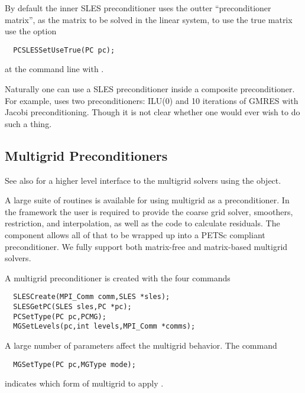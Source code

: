 By default the inner SLES preconditioner uses the outter ``preconditioner matrix'', 
as the matrix to be solved in the linear system, to use the true matrix use the 
option 
\begin{verbatim}
  PCSLESSetUseTrue(PC pc);
\end{verbatim}
at the command line with . 

Naturally one can use a SLES preconditioner inside a composite preconditioner. For example,
uses two preconditioners: ILU(0) and 10 iterations of GMRES with Jacobi preconditioning. Though
it is not clear whether one would ever wish to do such a thing.

\subsection{Multigrid Preconditioners}  \label{sec:mg}

See also  for a higher level
interface to the multigrid solvers using the  object.

A large suite of routines is available for using multigrid as a
preconditioner. In the  framework the user is required to provide 
the coarse grid solver, smoothers, restriction, and interpolation, 
as well as the code to calculate residuals. The  component 
allows all of that to be wrapped up into a PETSc compliant preconditioner. 
We fully support both matrix-free and matrix-based multigrid solvers.

A multigrid preconditioner is created with the four commands 
\begin{verbatim}
  SLESCreate(MPI_Comm comm,SLES *sles);
  SLESGetPC(SLES sles,PC *pc);
  PCSetType(PC pc,PCMG);
  MGSetLevels(pc,int levels,MPI_Comm *comms);
\end{verbatim}
A  
large number of parameters affect the multigrid behavior. The command
\begin{verbatim}
  MGSetType(PC pc,MGType mode); 
\end{verbatim}
indicates which form of multigrid to apply \cite{1sbg}. 
  

